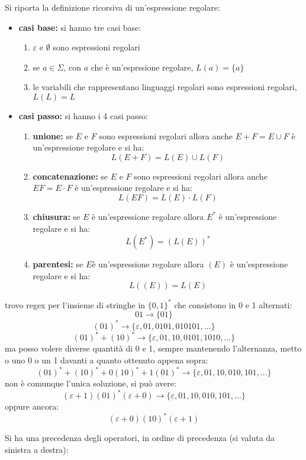 \documentclass[a4paper,12pt, oneside]{book}
\begin{document}
\begin{definizione}
Si riporta la definizione ricorsiva di un'espressione regolare:
\begin{itemize}
\item \textbf{casi base:} si hanno tre casi base:
\begin{enumerate}
\item $\varepsilon$ e $\emptyset$ sono espressioni regolari
\item se $a\in \Sigma$, con $a$ che è un'esprssione regolare, $L(a)=\{a\}$
\item le variabili che rappresentano linguaggi regolari sono espressioni regolari, $L(L)=L$
\end{enumerate}
\item \textbf{casi passo:} si hanno i 4 casi passo:
\begin{enumerate}
\item \textbf{unione:} se $E$ e $F$ sono espressioni regolari allora anche $E+F=E\cup F$ è un'espressione regolare e si ha:
$$L(E+F)=L(E)\cup L(F)$$
\item \textbf{concatenazione:} se $E$ e $F$ sono espressioni regolari allora anche $EF=E\cdot F$ è un'espressione regolare e si ha:
$$L(EF)=L(E)\cdot L(F)$$
\item \textbf{chiusura:} se $E$ è un'espressione regolare allora $E^*$ è un'espressione regolare e si ha:
$$L(E^*)=(L(E))^*$$
\item \textbf{parentesi:} se $E$è un'espressione regolare allora $(E)$ è un'espressione regolare e si ha:
$$L((E))=L(E)$$
\end{enumerate}
\end{itemize}
\newpage
\begin{esempio}
trovo regex per l'insieme di stringhe in $\{0,1\}^*$ che consistono in 0 e 1 alternati:\\
$$01\to \{01\}$$
$$(01)^*\to \{\varepsilon, 01, 0101,010101,...\}$$
$$(01)^*+(10)^*\to\{\varepsilon, 01,10,0101,1010,...\}$$
ma posso volere diverse quantità di 0 e 1, sempre mantenendo l'alternanza, metto o uno 0 o un 1 davanti a quanto ottenuto appena sopra:
$$(01)^*+(10)^*+0(10)^*+1(01)^*\to \{\varepsilon,01,10,010,101,...\}$$
non è comunque l'unica soluzione, si può avere:
$$(\varepsilon+1)(01)^*(\varepsilon+0)\to \{\varepsilon,01,10,010,101,...\}$$
oppure ancora:
$$(\varepsilon+0)(10)^*(\varepsilon+1)$$
\end{esempio}
\end{definizione}
Si ha una precedenza degli operatori, in ordine di precedenza (si valuta da sinistra a destra):
\end{document}
